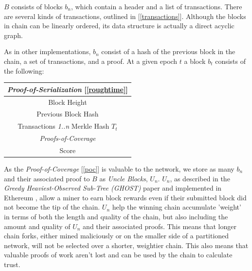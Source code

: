 \documentclass[letterpaper,11pt]{article}
\begin{document}
$\mathit{B}$ consists of blocks $\mathit{b_n}$, which contain a header and a list of transactions. There are several kinds of transactions, outlined in [\ref{transactions}]. Although the blocks in chain can be linearly ordered, its data structure is actually a direct acyclic graph.\newline

As in other implementations, $\mathit{b_n}$ consist of a hash of the previous block in the chain, a set of transactions, and a proof. At a given epoch $\mathit{t}$ a block $\mathit{b_t}$ consists of the following:

\begin{center}
	\begin{tabular}{|c|}
		\hline
		 \emph{Proof-of-Serialization} [\ref{roughtime}]\\
		 \hline
		 Block Height \\
		\hline
		 Previous Block Hash \\
		 \hline
		 Transactions \emph{1..n} Merkle Hash $\mathit{T_t}$ \\
		 \hline
		 \emph{Proofs-of-Coverage} \\
		 \hline
		 Score \\
		 \hline
	\end{tabular}
\end{center}

As the \emph{Proof-of-Coverage} [\ref{poc}] is valuable to the network, we store as many $\mathit{b_n}$ and their associated proof to $\mathit{B}$ as \emph{Uncle Blocks}, $\mathit{U_n}$. $\mathit{U_n}$, as described in the \emph{Greedy Heaviest-Observed Sub-Tree (GHOST)} \cite{ghost} paper and implemented in Ethereum \cite{ethereum}, allow a miner to earn block rewards even if their submitted block did not become the tip of the chain. $\mathit{U_n}$ help the winning chain accumulate 'weight' in terms of both the length and quality of the chain, but also including the amount and quality of $\mathit{U_n}$ and their associated proofs. This means that longer chain forks, either mined maliciously or on the smaller side of a partitioned network, will not be selected over a shorter, weightier chain. This also means that valuable proofs of work aren't lost and can be used by the chain to calculate trust.\newline
\end{document}
